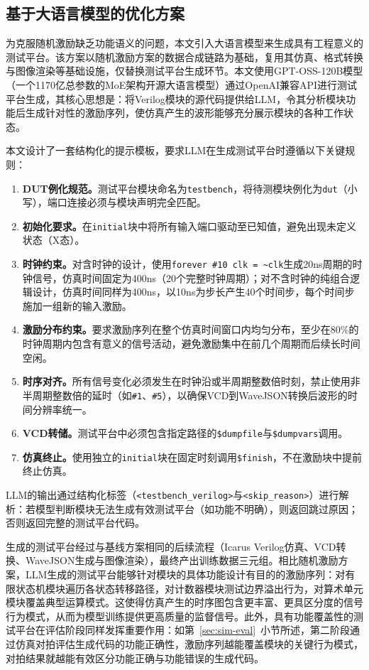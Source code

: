 \subsection{基于大语言模型的优化方案}

为克服随机激励缺乏功能语义的问题，本文引入大语言模型来生成具有工程意义的测试平台。该方案以随机激励方案的数据合成链路为基础，复用其仿真、格式转换与图像渲染等基础设施，仅替换测试平台生成环节。本文使用GPT-OSS-120B模型（一个1170亿总参数的MoE架构开源大语言模型）通过OpenAI兼容API进行测试平台生成，其核心思想是：将Verilog模块的源代码提供给LLM，令其分析模块功能后生成针对性的激励序列，使仿真产生的波形能够充分展示模块的各种工作状态。

本文设计了一套结构化的提示模板，要求LLM在生成测试平台时遵循以下关键规则：

\begin{enumerate}
  \item \textbf{DUT例化规范。}测试平台模块命名为\texttt{testbench}，将待测模块例化为\texttt{dut}（小写），端口连接必须与模块声明完全匹配。
  \item \textbf{初始化要求。}在\texttt{initial}块中将所有输入端口驱动至已知值，避免出现未定义状态（X态）。
  \item \textbf{时钟约束。}对含时钟的设计，使用\texttt{forever \#10 clk = \textasciitilde clk}生成20ns周期的时钟信号，仿真时间固定为400ns（20个完整时钟周期）；对不含时钟的纯组合逻辑设计，仿真时间同样为400ns，以10ns为步长产生40个时间步，每个时间步施加一组新的输入激励。
  \item \textbf{激励分布约束。}要求激励序列在整个仿真时间窗口内均匀分布，至少在80\%的时钟周期内包含有意义的信号活动，避免激励集中在前几个周期而后续长时间空闲。
  \item \textbf{时序对齐。}所有信号变化必须发生在时钟沿或半周期整数倍时刻，禁止使用非半周期整数倍的延时（如\texttt{\#1}、\texttt{\#5}），以确保VCD到WaveJSON转换后波形的时间分辨率统一。
  \item \textbf{VCD转储。}测试平台中必须包含指定路径的\texttt{\$dumpfile}与\texttt{\$dumpvars}调用。
  \item \textbf{仿真终止。}使用独立的\texttt{initial}块在固定时刻调用\texttt{\$finish}，不在激励块中提前终止仿真。
\end{enumerate}

LLM的输出通过结构化标签（\texttt{<testbench\_verilog>}与\texttt{<skip\_reason>}）进行解析：若模型判断模块无法生成有效测试平台（如功能不明确），则返回跳过原因；否则返回完整的测试平台代码。

生成的测试平台经过与基线方案相同的后续流程（Icarus Verilog仿真、VCD转换、WaveJSON生成与图像渲染），最终产出训练数据三元组。相比随机激励方案，LLM生成的测试平台能够针对模块的具体功能设计有目的的激励序列：对有限状态机模块遍历各状态转移路径，对计数器模块测试边界溢出行为，对算术单元模块覆盖典型运算模式。这使得仿真产生的时序图包含更丰富、更具区分度的信号行为模式，从而为模型训练提供更高质量的监督信号。此外，具有功能覆盖性的测试平台在评估阶段同样发挥重要作用：如第~\ref{sec:sim-eval}~小节所述，第二阶段通过仿真对拍评估生成代码的功能正确性，激励序列越能覆盖模块的关键行为模式，对拍结果就越能有效区分功能正确与功能错误的生成代码。


